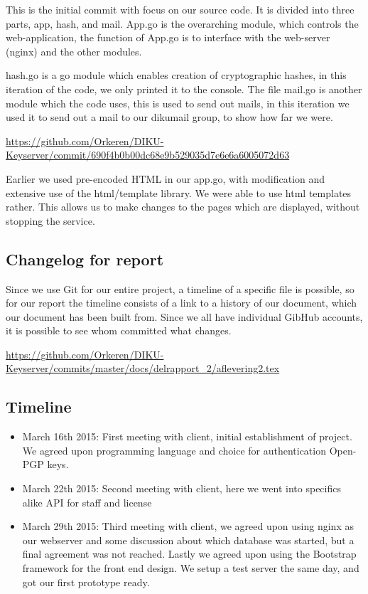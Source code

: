 \documentclass[11pt,a4paper]{report}
\begin{document}
This is the initial commit with focus on our source code. It is divided into three parts, app, hash, and mail. App.go is the overarching module, which controls the web-application, the function of App.go is to interface with the web-server (nginx) and the other modules.

hash.go is a go module which enables creation of cryptographic hashes, in this iteration of the code, we only printed it to the console.  The file mail.go is another module which the code uses, this is used to send out mails, in this iteration we used it to send out a mail to our dikumail group, to show how far we were.

\url{https://github.com/Orkeren/DIKU-Keyserver/commit/690f4b0b00dc68e9b529035d7e6e6a6005072d63}

Earlier we used pre-encoded HTML in our app.go, with modification and extensive use of the html/template library. We were able to use html templates rather. This allows us to make changes to the pages which are displayed, without stopping the service.

\subsection{Changelog for report}

Since we use Git for our entire project, a timeline of a specific file is possible, so for our report the timeline consists of a link to a history of our document, which our document has been built from. Since we all have individual GibHub accounts, it is possible to see whom committed what changes.

\urldef{\appendixtwo}\url{https://github.com/Orkeren/DIKU-Keyserver/commits/master/docs/delrapport_2/aflevering2.tex}
\appendixtwo %

\subsection{Timeline}
\begin{itemize}
  \item  March 16th 2015: First meeting with client, initial establishment of project. We agreed upon programming language and choice for authentication Open-PGP keys.
  \item  March 22th 2015: Second meeting with client, here we went into specifics alike API for staff and license
  \item March 29th 2015: Third meeting with client, we agreed upon using nginx as our webserver and some discussion about which database was started, but a final agreement was not reached. Lastly we agreed upon using the Bootstrap framework for the front end design. We setup a test server the same day, and got our first prototype ready.
\end{itemize}
\end{document}

